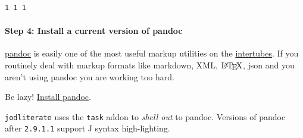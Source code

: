 \documentclass[11pt]{article}
\let\Oldlatex\LaTeX
\renewcommand{\LaTeX}{\textrm{\Oldlatex}}
\begin{document}
    \begin{Verbatim}[commandchars=\\\{\}]
1 1 1
    \end{Verbatim}

    \hypertarget{step-4-install-a-current-version-of-pandoc}{%
\paragraph{Step 4: Install a current version of
pandoc}\label{step-4-install-a-current-version-of-pandoc}}

\href{https://pandoc.org/}{pandoc} is easily one of the most useful
markup utilities on the
\href{https://www.urbandictionary.com/define.php?term=intertubes}{intertubes}.
If you routinely deal with markup formats like markdown, XML,
\(\LaTeX\), json and you aren't using pandoc you are working too hard.

Be lazy! \href{https://pandoc.org/installing.html}{Install pandoc}.

\texttt{jodliterate} uses the \texttt{task} addon to \emph{shell out} to
pandoc. Versions of pandoc after \texttt{2.9.1.1} support J syntax
high-lighting.
\end{document}
